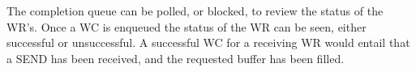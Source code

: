 The completion queue can be polled, or blocked, to review the status of the WR's.
Once a WC is enqueued the status of the WR can be seen, either successful or unsuccessful.
A successful WC for a receiving WR would entail that a SEND has been received, and the requested buffer has been filled.









